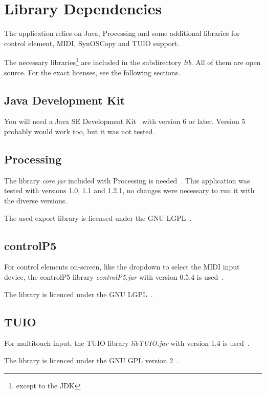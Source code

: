 \documentclass[12pt,a4paper,titlepage,oneside]{report}
\begin{document}
\section{Library Dependencies}
\label{sec:libdep}

The application relies on Java, Processing and some additional libraries for control element, MIDI, SynOSCopy and TUIO support.

The necessary libraries\footnote{except to the JDK} are included in the subdirectory \emph{lib}. All of them are open source. For the exact licenses, see the following sections.


\subsection{Java Development Kit}

You will need a Java SE Development Kit~\cite{bib:jdk} with version 6 or later. Version 5 probably would work too, but it was not tested.


\subsection{Processing}

The library \emph{core.jar} included with Processing is needed~\cite{bib:processing}. This application was tested with versions 1.0, 1.1 and 1.2.1, no changes were necessary to run it with the diverse versions. 

\noindent
The used export library is licensed under the GNU LGPL~\cite{bib:lgpl}.


\subsection{controlP5}

For control elements on-screen, like the dropdown to select the MIDI input device, the controlP5 library \emph{controlP5.jar} with version 0.5.4 is used~\cite{bib:controlP5}.

\noindent
The library is licenced under the GNU LGPL~\cite{bib:lgpl}.


\subsection{TUIO}

For multitouch input, the TUIO library \emph{libTUIO.jar} with version 1.4 is used~\cite{bib:tuio}.

\noindent
The library is licenced under the GNU GPL version 2~\cite{bib:gpl2}.
\end{document}
